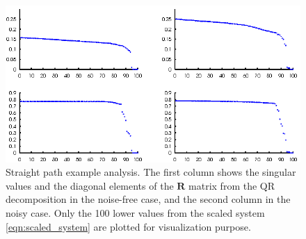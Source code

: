 \begin{figure}[t]
\centering
\includegraphics[]{fig/straight-path-merged.eps}
\caption{Straight path example analysis. The first column shows the singular
  values and the diagonal elements of the $\mathbf{R}$ matrix from the QR
  decomposition in the noise-free case, and the second column in the noisy
  case. Only the 100 lower values from the scaled system
  \eqref{eqn:scaled_system} are plotted for visualization purpose.\vspace*{-0.1in}}
\label{fig:straight-path-analysis}
\end{figure}



